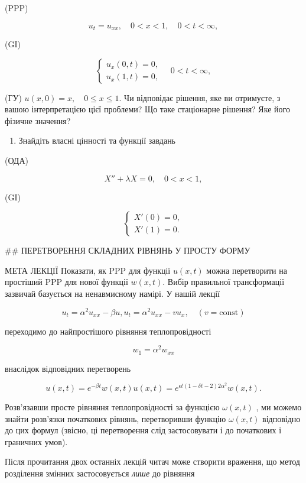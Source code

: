 \documentclass[
  ukrainian,
]{article}
\providecommand{\tightlist}{%
  \setlength{\itemsep}{0pt}\setlength{\parskip}{0pt}}
\begin{document}
(PPP)

\[
u_t = u_{xx}, \quad 0 < x < 1, \quad 0 < t < \infty,
\]

(GI)

\[
\begin{cases} u_x (0, t) = 0, \\ u_x (1, t) = 0, \end{cases} \quad 0 < t < \infty,
\]

(ГУ) \(u(x, 0) = x, \quad 0 \le x \le 1.\) Чи відповідає рішення, яке ви
отримуєте, з вашою інтерпретацією цієї проблеми? Що таке стаціонарне
рішення? Яке його фізичне значення?

\begin{enumerate}
\def\labelenumi{\arabic{enumi}.}
\setcounter{enumi}{3}
\tightlist
\item
  Знайдіть власні цінності та функції завдань
\end{enumerate}

(ОДА)

\[
X'' + \lambda X = 0, \quad 0 < x < 1,
\]

(GI)

\[
\begin{cases} X'(0) = 0, \\ X'(1) = 0. \end{cases}
\]

\#\# ПЕРЕТВОРЕННЯ СКЛАДНИХ РІВНЯНЬ У ПРОСТУ ФОРМУ

МЕТА ЛЕКЦІЇ Показати, як PPP для функції \(u(x, t)\) можна перетворити
на простіший PPP для нової функції \(w(x, t)\). Вибір правильної
трансформації зазвичай базується на ненавмисному намірі. У нашій лекції

\[
u_t = \alpha^2 u_{xx} - \beta u,
u_t = \alpha^2 u_{xx} - v u_x, \quad (v = \text{const})
\]

переходимо до найпростішого рівняння теплопровідності

\[
w_1 = \alpha^2 w_{xx}
\]

внаслідок відповідних перетворень

\[
u(x, t) = e^{-\beta t} w(x, t)
u(x, t) = e^{\epsilon t (1 - \delta t - 2) 2\alpha^2} w(x, t).
\]

Розв'язавши просте рівняння теплопровідності за функцією \(\omega(x,t)\)
, ми можемо знайти розв'язки початкових рівнянь, перетворивши функцію
\(\omega(x,t)\) відповідно до цих формул (звісно, ці перетворення слід
застосовувати і до початкових і граничних умов).

Після прочитання двох останніх лекцій читач може створити враження, що
метод розділення змінних застосовується \emph{лише} до рівняння
\end{document}

